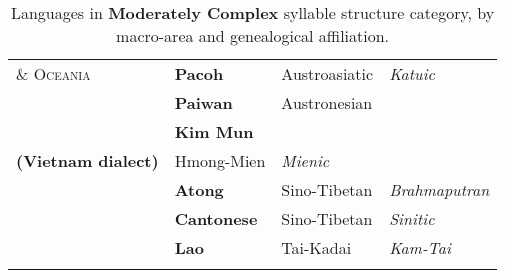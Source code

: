 \begin{table}
\begin{tabularx}{\textwidth}{XXXX}
\textsc{\&} \textsc{Oceania} & \textbf{Pacoh} & Austroasiatic & \textit{Katuic}\\
\hhline{-~~~} & \textbf{Paiwan} & Austronesian & \\
& \textbf{Kim Mun} \\
\textbf{(Vietnam dialect)} & Hmong-Mien & \textit{Mienic}\\
& \textbf{Atong} & Sino-Tibetan & \textit{Brahmaputran}\\
& \textbf{Cantonese} & Sino-Tibetan & \textit{Sinitic}\\
& \textbf{Lao} & Tai-Kadai & \textit{Kam-Tai}\\
\hhline{~---}
\lspbottomrule
\end{tabularx}
\caption{\label{tab:2.5.} Languages in \textbf{Moderately Complex} syllable structure category, by macro-area and genealogical affiliation.}
\end{table}




